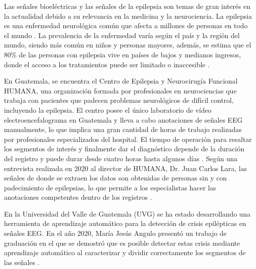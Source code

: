 Las señales bioeléctricas y las señales de la epilepsia son temas de gran interés en la actualidad debido a su relevancia en la medicina y la \gls{neurociencia}. La epilepsia es una enfermedad neurológica común que afecta a millones de personas en todo el mundo \cite{pichon2017patogenia}. La prevalencia de la enfermedad varía según el país y la región del mundo, siendo más común en niños y personas mayores, además, se estima que el 80\% de las personas con epilepsia vive en países de bajos y medianos ingresos, donde el acceso a los tratamientos puede ser limitado o inaccesible \cite{Epilepsia_OMS}.

En Guatemala, se encuentra el Centro de Epilepsia y Neurocirugía Funcional HUMANA, una organización formada por profesionales en neurociencias que trabaja con pacientes que padecen problemas neurológicos de difícil control, incluyendo la epilepsia. El centro posee el único laboratorio de vídeo electroencefalograma en Guatemala y lleva a cabo anotaciones de señales EEG manualmente, lo que implica una gran cantidad de horas de trabajo realizadas por profesionales especializados del hospital. El tiempo de operación para resaltar los segmentos de interés y finalmente dar el diagnóstico depende de la duración del registro y puede durar desde cuatro horas hasta algunos días \cite{humana_2021}. Según una entrevista realizada en 2020 al director de HUMANA, Dr. Juan Carlos Lara, las señales de donde se extraen los datos son obtenidas de personas sin y con padecimiento de epilepsias, lo que permite a los especialistas hacer las anotaciones competentes dentro de los registros \cite{camila_2022}.

En la Universidad del Valle de Guatemala (UVG) se ha estado desarrollando una herramienta de aprendizaje automático para la detección de crisis epilépticas en señales EEG. En el año 2020, María Jesús Angulo presentó un trabajo de graduación en el que se demostró que es posible detectar estas crisis mediante aprendizaje automático al caracterizar y dividir correctamente los segmentos de las señales \cite{María_ang_2020}. 


